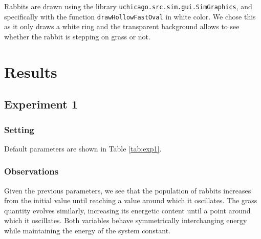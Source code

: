 \documentclass[11pt]{article}
\begin{document}
Rabbits are drawn using the library \texttt{uchicago.src.sim.gui.SimGraphics}, and specifically with the function \texttt{drawHollowFastOval} in white color. We chose this as it only draws a white ring and the transparent background allows to see whether the rabbit is stepping on grass or not.

\section{Results}

\subsection{Experiment 1}
\subsubsection{Setting}

Default parameters are shown in Table \ref{tab:exp1}.

\subsubsection{Observations}

\begin{minipage}[]{\textwidth}

\begin{minipage}[]{0.2\textwidth}
\label{tab:exp1}
\end{minipage}{}
\hfill
\begin{minipage}[]{0.75\textwidth}
Given the previous parameters, we see that the population of rabbits increases from the initial value until reaching a value around which it oscillates. The grass quantity evolves similarly, increasing its energetic content until a point around which it oscillates. Both variables behave symmetrically interchanging energy while maintaining the energy of the system constant.   
\end{minipage}{}

\end{minipage}{}
\end{document}
